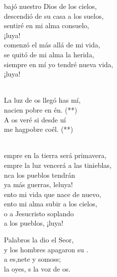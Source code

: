 \documentclass[12pt]{article}
\begin{document}
\begin{multicols*}{2}
\begin{cancion}%
	 bajó nuestro Dios de los cielos, \\
	 descendió de su casa a los suelos,\\
	 sentiré en mi alma consuelo, \\
	¡luya! \\
\jump
	 comenzó el más allá de mi vida, \\
	 se quitó de mi alma la herida,\\
	 siempre en mí yo tendré nueva vida,\\
	¡luya! \\\jump\\
	\begin{chorus}%
	La luz de os llegó has mí, \\
	nacien pobre en én. (**)\\
	A os veré si desde uí \\
	me hagpobre coél. (**)\\
	\end{chorus}%
	\jump\\
	empre en la tierra será primavera, \\
	empre la luz vencerá a las tinieblas,\\
	nca los pueblos tendrán \\
	ya más guerras, leluya!\\
\jump
	ento mi vida que nace de nuevo, \\
	ento mi alma subir a los cielos,\\
	o a Jesucristo soplando \\
	a los pueblos, ¡luya! \\
\end{cancion}%

\begin{cancion}[La Palabra][]%
	 Palabros la dio el Seor,\\
	y los hombres apagaron su .\\
	a es,nete y somoss;\\
	 la oyes, s la voz de os.\\
\end{cancion}%


\end{multicols*}
\end{document}
